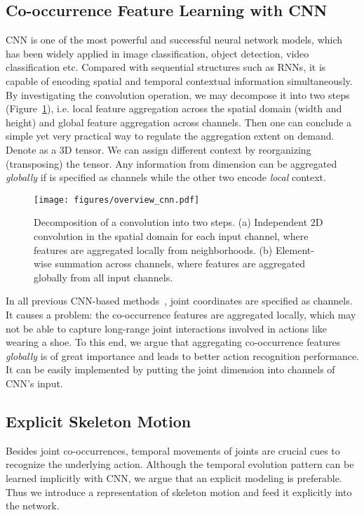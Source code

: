 \documentclass{article}
\begin{document}
\subsection{Co-occurrence Feature Learning with CNN}
\label{sec:global-co-occur}

CNN is one of the most powerful and successful neural network models, which has been widely applied in image classification, object detection, video classification etc. Compared with sequential structures such as RNNs, it is capable of encoding spatial and temporal contextual information simultaneously. By investigating the convolution operation, we may decompose it into two steps (Figure~\ref{fig:cnn_structure}), i.e. local feature aggregation across the spatial domain (width and height) and global feature aggregation across channels. Then one can conclude a simple yet very practical way to regulate the aggregation extent on demand. Denote  as a  3D tensor. We can assign different context by reorganizing (transposing) the tensor. Any information from dimension  can be aggregated \emph{globally} if is specified as channels while the other two encode \emph{local} context.

\begin{figure}[tbp]
  \centering
  \texttt{[image: figures/overview\_cnn.pdf]}
  \caption{Decomposition of a  convolution into two steps. (a) Independent 2D convolution in the spatial domain for each input channel, where features are aggregated locally from  neighborhoods. (b) Element-wise summation across channels, where features are aggregated globally from all input channels.}
  \label{fig:cnn_structure}
\end{figure}

In all previous CNN-based methods~\cite{Du2016Skeleton,Ke_2017_CVPR,Li_2017_ICMEW}, joint coordinates are specified as channels. It causes a problem: the co-occurrence features are aggregated locally, which may not be able to capture long-range joint interactions involved in actions like wearing a shoe. To this end, we argue that aggregating co-occurrence features \emph{globally} is of great importance and leads to better action recognition performance. It can be easily implemented by putting the joint dimension into channels of CNN's input.

\subsection{Explicit Skeleton Motion}
Besides joint co-occurrences, temporal movements of joints are crucial cues to recognize the underlying action. Although the temporal evolution pattern can be learned implicitly with CNN, we argue that an explicit modeling is preferable. Thus we introduce a representation of skeleton motion and feed it explicitly into the network.
\end{document}
